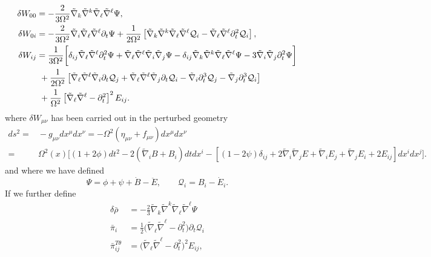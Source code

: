 \documentclass[10pt,letterpaper]{article}
\begin{document}
\begin{align}
\delta W_{00}  &= -\frac{2}{3\Omega^2}\tilde{\nabla}_k\tilde{\nabla}^k\tilde{\nabla}_{\ell}\tilde{\nabla}^\ell \Psi,
\nonumber\\	
\delta W_{0i} &=  -\frac{2}{3\Omega^2}\tilde{\nabla}_i\tilde{\nabla}_\ell \tilde{\nabla}^\ell \partial_t\Psi
	+\frac{1}{2\Omega^2}\left[\tilde{\nabla}_k\tilde{\nabla}^k\tilde{\nabla}_{\ell}\tilde{\nabla}^\ell \mathcal Q_i -  \tilde{\nabla}_{\ell}\tilde{\nabla}^\ell \partial_t^2\mathcal Q_i \right],
\nonumber\\	
\delta W_{ij}  &= \frac{1}{3\Omega^2}\bigg{[} \delta_{ij}\tilde{\nabla}_{\ell}\tilde{\nabla}^\ell  \partial_t^2\Psi +\tilde{\nabla}_{\ell}\tilde{\nabla}^\ell \tilde{\nabla}_i\tilde{\nabla}_j \Psi
- \delta_{ij}\tilde{\nabla}_k\tilde{\nabla}^k\tilde{\nabla}_{\ell}\tilde{\nabla}^\ell \Psi -3\tilde{\nabla}_i\tilde{\nabla}_j \partial_t^2 \Psi \bigg{] }
\nonumber\\
&{}\ +\frac{1}{2\Omega^2}\left[ \tilde{\nabla}_{\ell}\tilde{\nabla}^\ell \tilde{\nabla}_i   \partial_t\mathcal Q_j+ \tilde{\nabla}_{\ell}\tilde{\nabla}^\ell \tilde{\nabla}_j \partial_t \mathcal Q_i - \tilde{\nabla}_i\partial_t^3 \mathcal Q_j-\tilde{\nabla}_j\partial_t^3 \mathcal Q_i \right]
\nonumber\\
&{}\ +\frac{1}{\Omega^2}\left[\tilde{\nabla}_\ell\tilde{\nabla}^\ell-\partial_t^2\right]^2E_{ij}.
\end{align}
where $\delta W_{\mu\nu}$ has been carried out in the perturbed geometry
\begin{align}
ds^2 =&{} - g_{\mu\nu}dx^\mu dx^\nu= -\Omega^2(\eta_{\mu\nu}+f_{\mu\nu})dx^\mu dx^\nu \nonumber\\
=\ &{} \Omega^2(x)\bigg[ (1+2\phi)dt^2 - 2(\tilde\nabla_i B+ B_i)dtdx^i - [(1-2\psi)\delta_{ij} + 2\tilde\nabla_i\tilde\nabla_j E + \tilde\nabla_i E_j + \tilde\nabla_j E_i 
+ 2 E_{ij}]dx^idx^j\bigg].
\end{align}
and where we have defined
\begin{equation}
	\Psi = \phi + \psi +\dot{B}-\ddot{E},\qquad \mathcal Q_i = B_i - \dot{E}_i.
\end{equation}
If we further define
\begin{align}
\delta\bar \rho &=  -\frac{2}{3}\tilde{\nabla}_k\tilde{\nabla}^k\tilde{\nabla}_{\ell}\tilde{\nabla}^\ell \Psi\nonumber\\
\bar \pi_i &= \frac12\big( \tilde\nabla_\ell \tilde\nabla^\ell - \partial_t^2\big) \partial_t \mathcal Q_i\nonumber\\
\bar \pi_{ij}^{T\theta} &= \big(\tilde{\nabla}_\ell\tilde{\nabla}^\ell-\partial_t^2\big)^2E_{ij},
\end{align}
\end{document}
